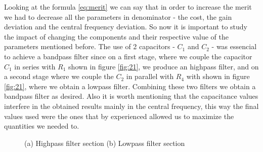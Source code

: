 \par Looking at the formula \ref{eq:merit} we can say that in order to increase the merit we had to decrease all the parameters in denominator - the cost, the gain deviation and the central 
frequency deviation. So now it is important to study the impact of changing the components and their respective value of the parameters mentioned before. The use of 2 capacitors - $C_{1}$ and $C_{2}$ - was 
essencial to achieve a bandpass filter since on a first stage, where we couple the capacitor $C_{1}$ in series with $R_{1}$ shown in figure \ref{fig:21}, we produce an highpass filter, 
and on a second stage where we couple the $C_{2}$ in parallel with $R_{4}$ with shown in figure \ref{fig:21}, where we obtain a lowpass filter. Combining these two filters we obtain a bandpass filter as desired. 
Also it is worth mentioning that the capacitance values interfere in the 
obtained results mainly in the central frequency, this way the final values used were the ones that by experienced allowed us to maximize the quantities we needed to.

\begin{figure}[h!]
           \centering
           \caption{(a) Highpass filter section (b) Lowpass filter section}

\end{figure}


